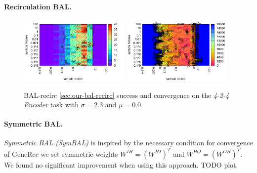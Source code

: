 \paragraph{Recirculation BAL.} 
\begin{figure}[H]
  \centering
  \includegraphics[width=0.48\textwidth]{img/bal-recirc-auto4-success.pdf}   
  \includegraphics[width=0.48\textwidth]{img/bal-recirc-auto4-epoch.pdf}     
  \caption{BAL-recirc \ref{sec:our-bal-recirc} success and convergence on the \emph{4-2-4 Encoder} task with $\sigma = 2.3$ and $\mu = 0.0$.}
  \label{fig:results-bal-recirc-auto4-performance}
\end{figure}

\paragraph{Symmetric BAL.} 
\label{sec:our-bal-sym} 
\emph{Symmetric BAL (SymBAL)} is inspired by the necessary condition for convergence of GeneRec \citep{o1996bio} we set symmetric weights $W^{IH} = (W^{HI})^T$ and $W^{HO} = (W^{OH})^T$. We found no significant improvement when using this approach. TODO plot. 

